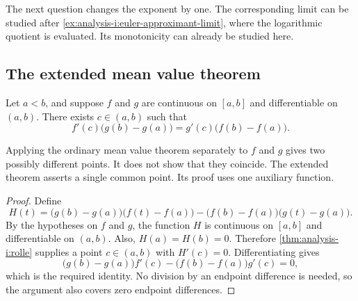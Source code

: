 The next question changes the exponent by one.
The corresponding limit can be studied after
\autoref{ex:analysis-i:euler-approximant-limit}, where the logarithmic
quotient is evaluated. Its monotonicity can already be studied here.


\subsection{The extended mean value theorem}
\begin{theorem}
  \label{thm:analysis-i:cauchy-mean-value}
  Let $a<b$, and suppose $f$ and $g$ are continuous
  on $[a,b]$ and differentiable on $(a,b)$. There exists $c\in(a,b)$
  such that
  \[
    f'(c)\bigl(g(b)-g(a)\bigr)
      =g'(c)\bigl(f(b)-f(a)\bigr).
  \]
\end{theorem}
Applying the ordinary mean value theorem separately
to $f$ and $g$ gives two possibly different points. It does not show that
they coincide. The extended theorem asserts a single common point.
Its proof uses one auxiliary function.
\begin{proof}
  Define
  \[
    H(t)=\bigl(g(b)-g(a)\bigr)\bigl(f(t)-f(a)\bigr)
      -\bigl(f(b)-f(a)\bigr)\bigl(g(t)-g(a)\bigr).
  \]
  By the hypotheses on $f$ and $g$, the function $H$ is continuous on
  $[a,b]$ and differentiable on $(a,b)$. Also, $H(a)=H(b)=0$.
  Therefore \autoref{thm:analysis-i:rolle} supplies a point $c\in(a,b)$
  with $H'(c)=0$. Differentiating gives
  \[
    \bigl(g(b)-g(a)\bigr)f'(c)
      -\bigl(f(b)-f(a)\bigr)g'(c)=0,
  \]
  which is the required identity. No division by an endpoint difference
  is needed, so the argument also covers zero endpoint differences.
\end{proof}
